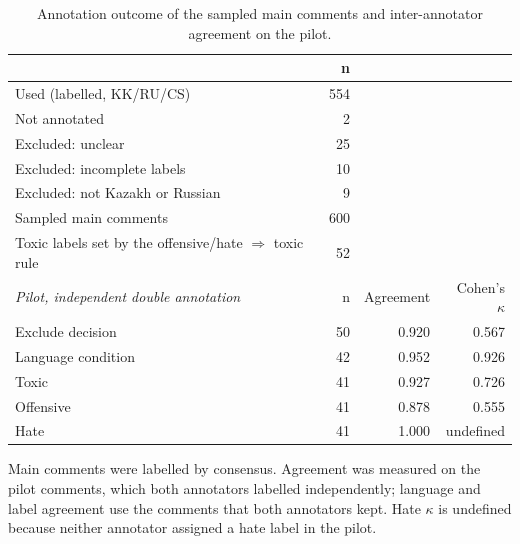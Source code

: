 \begin{table}[htbp]
\centering
\caption{Annotation outcome of the sampled main comments and inter-annotator agreement on the pilot.}
\label{tab:annotation}
\begin{tabular}{lrrr}
\toprule
 & n &  &  \\
\midrule
Used (labelled, KK/RU/CS) & 554 &  &  \\
Not annotated & 2 &  &  \\
Excluded: unclear & 25 &  &  \\
Excluded: incomplete labels & 10 &  &  \\
Excluded: not Kazakh or Russian & 9 &  &  \\
\midrule
Sampled main comments & 600 &  &  \\
\midrule
Toxic labels set by the offensive/hate $\Rightarrow$ toxic rule & 52 &  &  \\
\midrule
\textit{Pilot, independent double annotation} & n & Agreement & Cohen's $\kappa$ \\
Exclude decision & 50 & 0.920 & 0.567 \\
Language condition & 42 & 0.952 & 0.926 \\
Toxic & 41 & 0.927 & 0.726 \\
Offensive & 41 & 0.878 & 0.555 \\
Hate & 41 & 1.000 & undefined \\
\bottomrule
\end{tabular}
\par\smallskip\footnotesize Main comments were labelled by consensus. Agreement was measured on the pilot comments, which both annotators labelled independently; language and label agreement use the comments that both annotators kept. Hate $\kappa$ is undefined because neither annotator assigned a hate label in the pilot.
\end{table}
